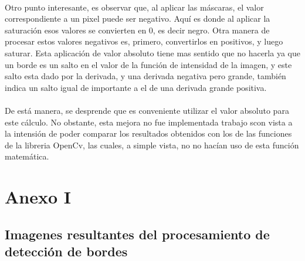 \documentclass[11pt, a4paper]{article}
\begin{document}
\paragraph{}
Otro punto interesante, es observar que, al aplicar las m\'ascaras, el valor correspondiente a un pixel puede ser negativo. Aqu\'i es donde al aplicar la saturaci\'on esos valores se convierten en 0, es decir negro. Otra manera de procesar estos valores negativos es, primero, convertirlos en positivos, y luego saturar. Esta aplicaci\'on de valor absoluto tiene mas sentido que no hacerla ya que un borde es un salto en el valor de la funci\'on de intensidad de la imagen, y este salto esta dado por la derivada, y una derivada negativa pero grande, tambi\'en indica un salto igual de importante a el de una derivada grande positiva.

\paragraph{}
De est\'a manera, se desprende que es conveniente utilizar el valor absoluto para este c\'alculo. No obstante, esta mejora no fue implementada trabajo scon vista a la intensi\'on de poder comparar los resultados obtenidos con los de las funciones de la libreria OpenCv, las cuales, a simple vista, no no hac\'ian uso de esta funci\'on matem\'atica.


\newpage
\section{Anexo I}
\subsection{Imagenes resultantes del procesamiento de detecci\'on de bordes}

\vspace{2cm}
\end{document}
